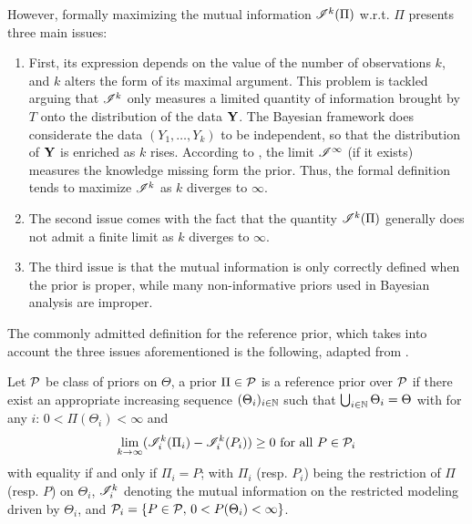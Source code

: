 However, formally maximizing the mutual information $\mathscr{I}^k(\Pi)$ w.r.t. $\Pi$ presents three main issues: %
\begin{enumerate}
    \item First, its expression depends on the value of the number of  observations $k$, and $k$ alters the form of its maximal argument. %
    This problem is tackled arguing that $\mathscr{I}^k$ only measures a limited quantity of information brought by $T$ onto the distribution of the data $\mathbf{Y}$. The Bayesian framework does considerate the data $(Y_1,\dots,Y_k)$ to be independent, so that the distribution of $\mathbf{Y}$ is enriched as $k$ rises.
    According to \citet{bernardo_bayesian_1994}, the limit $\mathscr{I}^\infty$ (if it exists) measures the knowledge missing form the prior.
    Thus, the formal definition tends to maximize $\mathscr{I}^k$ as $k$ diverges to $\infty$.
    \item The second issue comes with the fact that the quantity $\mathscr{I}^k(\Pi)$ generally does not admit a finite limit as $k$ diverges to $\infty$.
    \item The third issue is that the mutual information is only correctly defined when the prior is proper, while many non-informative priors used in Bayesian analysis are improper.
\end{enumerate}

The commonly admitted definition for the reference prior, which takes into account the three issues aforementioned is the following, adapted from \cite{dey_reference_2005}.
\begin{defi}\label{def:intro-ref:ref-priors}
    Let $\mathcal{P}$ be class of priors on $\Theta$, a prior $\Pi\in\mathcal{P}$ %
    is a reference prior over $\mathcal{P}$ if there exist an appropriate increasing sequence $(\Theta_i)_{i\in\mathbb{N}}$ such that $\bigcup_{i\in\mathbb{N}}\Theta_i=\Theta$ with for any $i$: $0<\Pi(\Theta_i)<\infty  $ and
        \begin{equation}
            \lim_{k\rightarrow\infty} (\mathscr{I}^k_i(\Pi_i) - \mathscr{I}^k_i(P_i) )\geq 0 \text{\ for all\ } P\in\mathcal{P}_i
        \end{equation}
    with equality if and only if $\Pi_i=P$; with $\Pi_i$ (resp. $P_i$) being the restriction of $\Pi$ (resp. $P$) on $\Theta_i$, $\mathscr{I}_i^k$ denoting the mutual information on the restricted modeling driven by $\Theta_i$, and $\mathcal{P}_i=\{P\in\mathcal{P},\,0<P(\Theta_i)<\infty\}$.
\end{defi}

